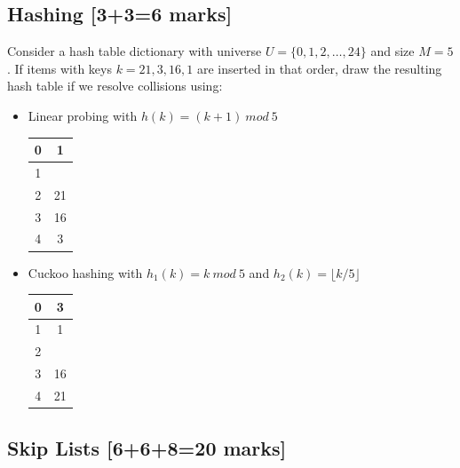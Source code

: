 \documentclass[12pt]{article}
\begin{document}
\subsection{Hashing [3+3=6 marks]}
Consider a hash table dictionary with universe $U=\{0, 1, 2, \dots , 24\}$ and size $M =5$. If items with keys $k = 21, 3, 16, 1$ are inserted in that order, draw the resulting hash table if we resolve collisions using:
\begin{itemize}
\item Linear probing with $h(k) = (k+1)~mod~5$\\
\begin{tabular}{c|c|}
  \hline
  0 & 1\\
  \hline
  1 & \\
  \hline
  2 & 21\\
  \hline
  3 & 16\\
  \hline
  4 & 3\\
  \hline
\end{tabular}
\item  Cuckoo hashing with $h_1(k) = k~mod~5$ and $h_2(k) =\lfloor k/5 \rfloor$ \\
\begin{tabular}{c|c|}
  \hline
  0 & 3\\
  \hline
  1 & 1\\
  \hline
  2 & \\
  \hline
  3 & 16\\
  \hline
  4 & 21\\
  \hline
\end{tabular}
\end{itemize}

\subsection{Skip Lists [6+6+8=20 marks]}
\end{document}
